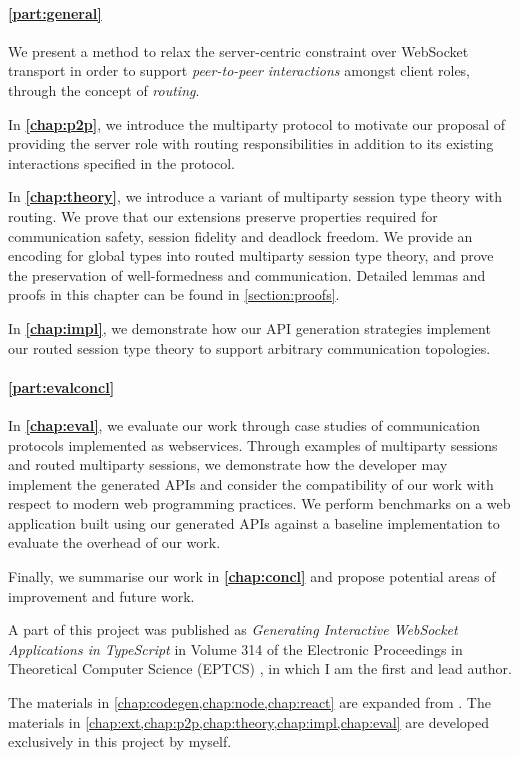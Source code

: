 \paragraph{\cref{part:general}} 
We present a method to relax the server-centric constraint over WebSocket
transport in order to support \textit{peer-to-peer interactions} 
amongst 
client roles, through the concept of \emph{routing}.

In \textbf{\cref{chap:p2p}}, 
we introduce the  multiparty
protocol to motivate our proposal of providing the server role with 
routing responsibilities in addition to its existing interactions
specified in the protocol.

In \textbf{\cref{chap:theory}}, 
we introduce a variant of multiparty 
session type theory with routing. We prove that our extensions preserve 
properties required for communication safety, 
session fidelity and deadlock freedom.
We provide an encoding for global types into routed multiparty 
session type theory, and prove the preservation of well-formedness
and communication. Detailed lemmas and proofs in this chapter can
be found in \cref{section:proofs}.

In \textbf{\cref{chap:impl}}, 
we demonstrate how our API generation strategies
implement our routed session type theory to support arbitrary communication
topologies.

\paragraph{\cref{part:evalconcl}}
In \textbf{\cref{chap:eval}}, 
we evaluate our work through 
case studies of communication protocols 
implemented as webservices. Through examples of
multiparty sessions and routed multiparty sessions, 
we demonstrate how the
developer may implement the generated APIs and 
consider the compatibility of our work with respect to
modern web programming practices.
We perform benchmarks on a web application built using our
generated APIs against a baseline implementation to evaluate
the overhead of our work.

Finally, we summarise our work in \textbf{\cref{chap:concl}} 
and propose potential
areas of improvement and future work.

\begin{remark}
A part of this project was published as 
\emph{Generating Interactive WebSocket 
Applications in TypeScript} in Volume 314 of the Electronic Proceedings
in Theoretical Computer Science (EPTCS) \cite{PLACES2020},
in which I am the first and lead author.

The materials in \cref{chap:codegen,chap:node,chap:react}
are expanded from \cite{PLACES2020}.
The materials in 
\cref{chap:ext,chap:p2p,chap:theory,chap:impl,chap:eval}
are developed exclusively in this project by myself.
\end{remark}